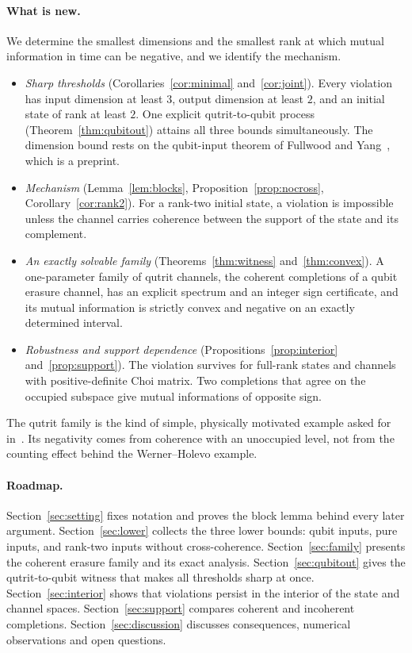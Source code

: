 \documentclass[11pt,a4paper]{article}
\theoremstyle{definition}\newtheorem{definition}[theorem]{Definition}
\theoremstyle{remark}\newtheorem{remark}[theorem]{Remark}
\begin{document}
\paragraph{What is new.} We determine the smallest dimensions and the smallest rank at which mutual information in time can be negative, and we identify the mechanism.
\begin{itemize}
 \item \emph{Sharp thresholds} (Corollaries~\ref{cor:minimal} and~\ref{cor:joint}). Every violation has input dimension at least $3$, output dimension at least $2$, and an initial state of rank at least $2$. One explicit qutrit-to-qubit process (Theorem~\ref{thm:qubitout}) attains all three bounds simultaneously. The dimension bound rests on the qubit-input theorem of Fullwood and Yang~\cite{FY}, which is a preprint.
 \item \emph{Mechanism} (Lemma~\ref{lem:blocks}, Proposition~\ref{prop:nocross}, Corollary~\ref{cor:rank2}). For a rank-two initial state, a violation is impossible unless the channel carries coherence between the support of the state and its complement.
 \item \emph{An exactly solvable family} (Theorems~\ref{thm:witness} and~\ref{thm:convex}). A one-parameter family of qutrit channels, the coherent completions of a qubit erasure channel, has an explicit spectrum and an integer sign certificate, and its mutual information is strictly convex and negative on an exactly determined interval.
 \item \emph{Robustness and support dependence} (Propositions~\ref{prop:interior} and~\ref{prop:support}). The violation survives for full-rank states and channels with positive-definite Choi matrix. Two completions that agree on the occupied subspace give mutual informations of opposite sign.
\end{itemize}
The qutrit family is the kind of simple, physically motivated example asked for in~\cite[Section~6]{FY}. Its negativity comes from coherence with an unoccupied level, not from the counting effect behind the Werner--Holevo example.

\paragraph{Roadmap.} Section~\ref{sec:setting} fixes notation and proves the block lemma behind every later argument. Section~\ref{sec:lower} collects the three lower bounds: qubit inputs, pure inputs, and rank-two inputs without cross-coherence. Section~\ref{sec:family} presents the coherent erasure family and its exact analysis. Section~\ref{sec:qubitout} gives the qutrit-to-qubit witness that makes all thresholds sharp at once. Section~\ref{sec:interior} shows that violations persist in the interior of the state and channel spaces. Section~\ref{sec:support} compares coherent and incoherent completions. Section~\ref{sec:discussion} discusses consequences, numerical observations and open questions.
\end{document}
